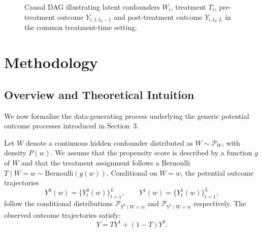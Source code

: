 \documentclass[10pt]{article} %
\begin{document}
\begin{figure}[t]
\centering

\caption{Causal DAG \citep{joffe2012causal} illustrating  { latent confounders {$W_i$}, treatment {$T_i$}, pre-treatment outcome $Y_{i,1:t_0-1}$ and post-treatment outcome {$Y_{i,t_0:L}$} in the common treatment-time setting.}}
\label{fig:dag}
\end{figure}

\section{Methodology}

\subsection{Overview and Theoretical Intuition}
{We now formalize the data-generating process underlying the generic potential outcome processes introduced in Section~3.}

 Let \( W \) denote a continuous hidden confounder distributed as \( W \sim \mathcal{P}_W \), with density \( P(w) \). We assume that the propensity score is described by a function \(g\) of \(W\) and that the treatment assignment follows a Bernoulli \( T \mid W = w \sim \text{Bernoulli}(g(w)) \). 
  {Conditional on $W=w$, the potential outcome trajectories
\[
Y^0(w)=\{Y_t^0(w)\}_{t=1}^L,
\qquad
Y^1(w)=\{Y_t^1(w)\}_{t=1}^L,
\]
follow the conditional distributions $\mathcal P_{Y^0\mid W=w}$ and $\mathcal P_{Y^1\mid W=w}$ respectively.}
{The observed outcome trajectories satisfy: \[ Y = TY^1+(1-T)Y^0.\]}
 
\end{document}
